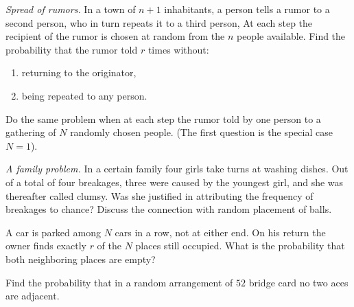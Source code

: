 \begin{problem}[Handout 2, \# 13]
  \emph{Spread of rumors.} In a town of \(n+1\) inhabitants, a person tells
  a rumor to a second person, who in turn repeats it to a third person,
  \etc{} At each step the recipient of the rumor is chosen at random from the
  \(n\) people available. Find the probability that the rumor told \(r\)
  times without:
  \begin{enumerate}[label=(\alph*),noitemsep]
  \item returning to the originator,
  \item being repeated to any person.
  \end{enumerate}
  Do the same problem when at each step the rumor told by one person to a
  gathering of \(N\) randomly chosen people. (The first question is the
  special case \(N=1\)).
\end{problem}
\begin{solution}

\end{solution}
\newpage

\begin{problem}[Handout 2, \# 14]
  \emph{A family problem.} In a certain family four girls take turns at
  washing dishes. Out of a total of four breakages, three were caused by
  the youngest girl, and she was thereafter called clumsy. Was she
  justified in attributing the frequency of breakages to chance? Discuss
  the connection with random placement of balls.
\end{problem}
\begin{solution}

\end{solution}
\newpage

\begin{problem}[Handout 2, \# 15]
  A car is parked among \(N\) cars in a row, not at either end. On his
  return the owner finds exactly \(r\) of the \(N\) places still
  occupied. What is the probability that both neighboring places are empty?
\end{problem}
\begin{solution}

\end{solution}
\newpage

\begin{problem}[Handout 2, \# 16]
  Find the probability that in a random arrangement of \(52\) bridge card
  no two aces are adjacent.
\end{problem}
\begin{solution}

\end{solution}
\newpage

